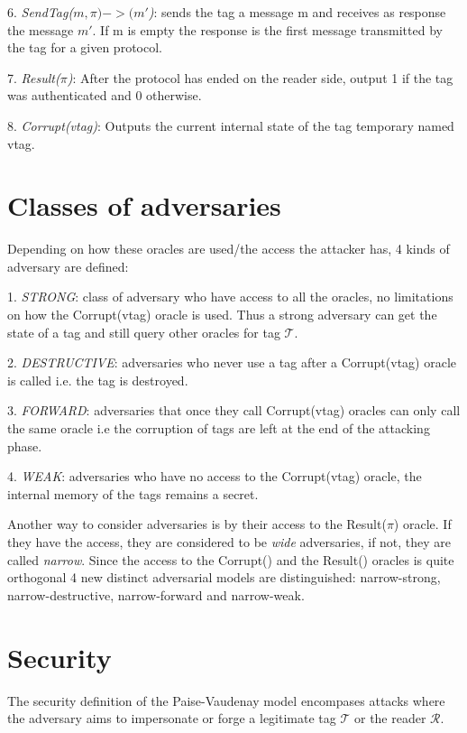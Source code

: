     6. \textit{SendTag($m, \pi) -> (m'$)}: sends the tag a message m and receives as response 
    the message $m'$. If m is empty the response is the first message transmitted by the tag for
    a given protocol. 

    7. \textit{Result($\pi$)}: After the protocol has ended on the reader side, output 1 if the tag was 
    authenticated and 0 otherwise.

    8. \textit{Corrupt(vtag)}: Outputs the current internal state of the tag temporary named vtag. 

    \section{Classes of adversaries}
    Depending on how these oracles are used/the access the attacker has, 4 kinds of adversary are defined:
    
    1. \textit{STRONG}: class of adversary who have access to all the oracles, no limitations on how the Corrupt(vtag) oracle
    is used. Thus a strong adversary can get the state of a tag and still query other oracles for tag $\mathcal{T}$.

    2. \textit{DESTRUCTIVE}: adversaries who never use a tag after a Corrupt(vtag) oracle is called
        i.e. the tag is destroyed.

    3. \textit{FORWARD}: adversaries that once they call Corrupt(vtag) oracles can only call the same oracle
        i.e the corruption of tags are left at the end of the attacking phase.

    4. \textit{WEAK}: adversaries who have no access to the Corrupt(vtag) oracle, the internal memory of the tags remains a secret. 

    Another way to consider adversaries is by their access to the Result($\pi$) oracle. If they have the access, they are considered to be
    \textit{wide} adversaries, if not, they are called \textit{narrow}. Since the access to the Corrupt() and the Result() oracles
    is quite orthogonal 4 new distinct adversarial models are distinguished: narrow-strong, narrow-destructive, narrow-forward and narrow-weak.

\section{Security}

    The security definition of the Paise-Vaudenay model \cite{PV model} encompases attacks where the adversary aims to impersonate or 
    forge a legitimate tag $\mathcal{T}$ or the reader $\mathcal{R}$.

